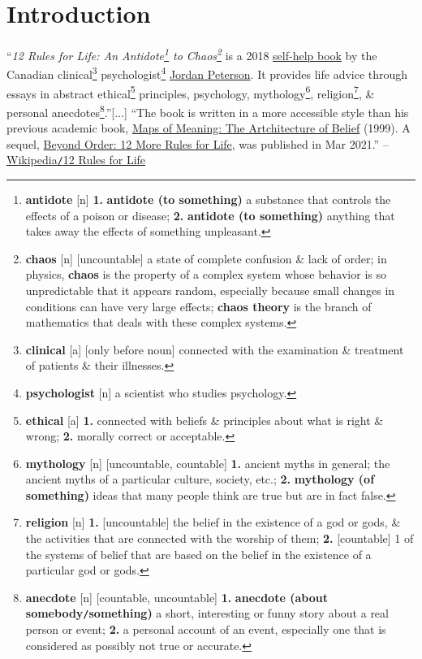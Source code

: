 \documentclass[oneside]{book}
\numberwithin{equation}{section}
\begin{document}
\section*{Introduction}
``\textit{12 Rules for Life: An Antidote\footnote{\textbf{antidote} [n] \textbf{1.} \textbf{antidote (to something)} a substance that controls the effects of a poison or disease; \textbf{2.} \textbf{antidote (to something)} anything that takes away the effects of something unpleasant.} to Chaos\footnote{\textbf{chaos} [n] [uncountable] a state of complete confusion \& lack of order; in physics, \textbf{chaos} is the property of a complex system whose behavior is so unpredictable that it appears random, especially because small changes in conditions can have very large effects; \textbf{chaos theory} is the branch of mathematics that deals with these complex systems.}} is a 2018 \href{https://en.wikipedia.org/wiki/Self-help_book}{self-help book} by the Canadian clinical\footnote{\textbf{clinical} [a] [only before noun] connected with the examination \& treatment of patients \& their illnesses.} psychologist\footnote{\textbf{psychologist} [n] a scientist who studies psychology.} \href{https://en.wikipedia.org/wiki/Jordan_Peterson}{Jordan Peterson}. It provides life advice through essays in abstract ethical\footnote{\textbf{ethical} [a] \textbf{1.} connected with beliefs \& principles about what is right \& wrong; \textbf{2.} morally correct or acceptable.} principles, psychology, mythology\footnote{\textbf{mythology} [n] [uncountable, countable] \textbf{1.} ancient myths in general; the ancient myths of a particular culture, society, etc.; \textbf{2.} \textbf{mythology (of something)} ideas that many people think are true but are in fact false.}, religion\footnote{\textbf{religion} [n] \textbf{1.} [uncountable] the belief in the existence of a god or gods, \& the activities that are connected with the worship of them; \textbf{2.} [countable] 1 of the systems of belief that are based on the belief in the existence of a particular god or gods.}, \& personal anecdotes\footnote{\textbf{anecdote} [n] [countable, uncountable] \textbf{1.} \textbf{anecdote (about somebody\texttt{/}something)} a short, interesting or funny story about a real person or event; \textbf{2.} a personal account of an event, especially one that is considered as possibly not true or accurate.}.''[$\ldots$] ``The book is written in a more accessible style than his previous academic book, \href{https://en.wikipedia.org/wiki/Maps_of_Meaning:_The_Architecture_of_Belief}{Maps of Meaning: The Artchitecture of Belief} (1999). A sequel, \href{https://en.wikipedia.org/wiki/Beyond_Order}{Beyond Order: 12 More Rules for Life}, was published in Mar 2021.'' -- \href{https://en.wikipedia.org/wiki/12_Rules_for_Life}{Wikipedia\texttt{/}12 Rules for Life}
\end{document}
